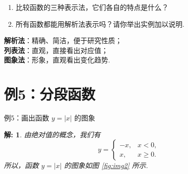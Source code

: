 \documentclass[aspectratio=169,13pt,t] {beamer}
\newtheorem*{solve}{解:}
\theoremstyle{definition}
\newtheorem{exam}{例}
\begin{document}
\begin{frame}%
	\begin{summarybox}[思考]
		\begin{enumerate}[(1)]
			\item 比较函数的三种表示法，它们各自的特点是什么？
			\item 所有函数都能用解析法表示吗？请你举出实例加以说明.
		\end{enumerate}
	\end{summarybox}
	\vspace{1em}
	\pause
	\begin{summarybox-answer}
		\textbf{解析法}：精确、简洁，便于研究性质；\\
		\textbf{列表法}：直观，直接看出对应值；\\
		\textbf{图象法}：形象，直观看出变化趋势.
	\end{summarybox-answer}
\end{frame}

\section{例5：分段函数}

\begin{frame}{例5：画出函数 \(y = |x|\) 的图象}
	\begin{solve}
		由绝对值的概念，我们有
		\[
			y = \begin{cases} -x, & x < 0, \\ x, & x \geqslant 0. \end{cases}
		\]
		所以，函数 \(y = |x|\) 的图象如图 \ref{fig:img2} 所示.
	\end{solve}
\end{frame}
\end{document}
